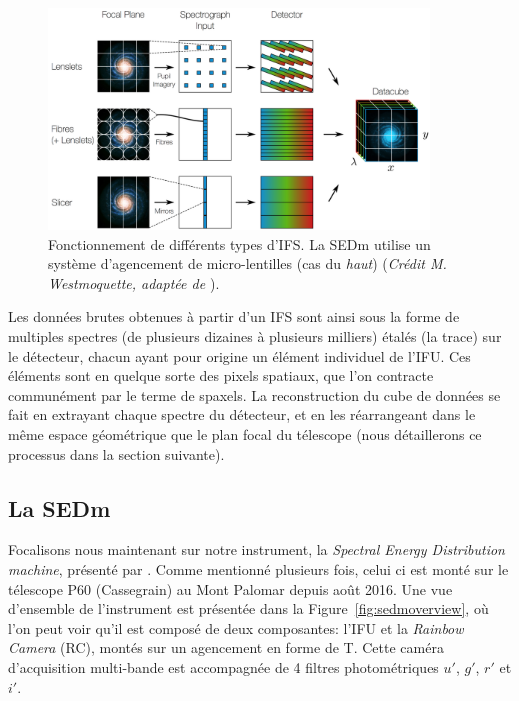 \documentclass[../main/main.tex]{subfiles}
\begin{document}
\begin{figure}[ht]
  \centering
  \includegraphics[width=0.9\textwidth]{../figures/03_sedm/ifsgeneral.png}
  \caption[Fonctionnement de différents types d'IFS]{Fonctionnement de
    différents types d'IFS. La SEDm utilise un système d'agencement de micro-lentilles (cas
    du \textit{haut})
    (\textit{Crédit M. Westmoquette, adaptée de \citet{allingtonIFS}}).}
  \label{fig:ifsgeneral}
\end{figure}

Les données brutes obtenues à partir d'un IFS sont ainsi sous la forme
de multiples spectres (de plusieurs dizaines à plusieurs milliers)
étalés (la trace) sur le détecteur, chacun ayant pour origine un élément individuel
de l'IFU. Ces éléments sont en quelque sorte des pixels spatiaux, que
l'on contracte communément par le terme de spaxels. La reconstruction du
cube de données se fait en extrayant chaque spectre du détecteur, et en
les réarrangeant dans le même espace géométrique que le plan focal du
télescope (nous détaillerons ce processus dans la section suivante).

\subsection{La SEDm}\label{ssec:sedm}

Focalisons nous maintenant sur notre instrument, la \textit{Spectral Energy
Distribution machine}, présenté par \citet{SEDM18}. Comme mentionné plusieurs fois, celui ci est monté
sur le télescope P60 (Cassegrain) au Mont Palomar depuis août 2016. Une vue
d'ensemble de l'instrument est présentée dans la
Figure~\ref{fig:sedmoverview}, où l'on peut voir qu'il est composé de
deux composantes: l'IFU et la \textit{Rainbow Camera} (RC), montés sur un
agencement en forme de T. Cette caméra d'acquisition multi-bande est
accompagnée de 4 filtres photométriques $u'$, $g'$, $r'$ et $i'$.
\end{document}
